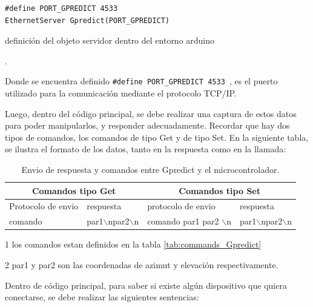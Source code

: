 \begin{listing}[ht!]
	\begin{verbatim}
#define PORT_GPREDICT 4533 
EthernetServer Gpredict(PORT_GPREDICT)
	\end{verbatim}

\caption{definición del objeto servidor dentro del entorno arduino}. 
\label{cod:obj_serv_gpr}
\end{listing}
Donde se encuentra definido \texttt{#define PORT_GPREDICT 4533 }, es el puerto utilizado para la comunicación mediante el protocolo TCP/IP.

Luego, dentro del código principal, se debe realizar una captura de estos datos para poder manipularlos, y responder adecuadamente. Recordar que hay dos tipos de comandos, los comandos de tipo Get y de tipo Set. En la siguiente tabla, se ilustra el formato de los datos, tanto en la respuesta como en la llamada: 
\begin{table}[ht]
	\centering
 \begin{threeparttable}	
	\begin{tabular}{|p{2.0cm}|p{2.0cm}|p{2.0cm}|p{2.0cm}|} 
		\hline
		\multicolumn{2}{|c|}{Comandos tipo Get} &\multicolumn{2}{c|}{Comandos tipo Set}  
		\\ \hline 
		Protocolo de envio & respuesta & protocolo de envio & respuesta \\ \hline 
		comando\tnote{1} & par1$\backslash$npar2$\backslash$n & 
		comando\tnote{1} par1\tnote{2} par2\tnote{2}  $\backslash$n & par1$\backslash$npar2$\backslash$n  \\ 
		\hline 
	\end{tabular}
	\begin{tablenotes}
		\item [1] los comandos estan definidos en la tabla \ref{tab:commands_Gpredict}   
		\item [2] par1 y par2 son las coordenadas de azimut y elevación respectivamente.  
		
	\end{tablenotes}


\end{threeparttable}
	\caption{Envio de respuesta y comandos entre Gpredict y el microcontrolador.}
	\label{tab:protocol_tx_gpr}
\end{table}


Dentro de código principal, para saber si existe algún dispositivo que quiera conectarse, se debe realizar las siguientes sentencias: 

